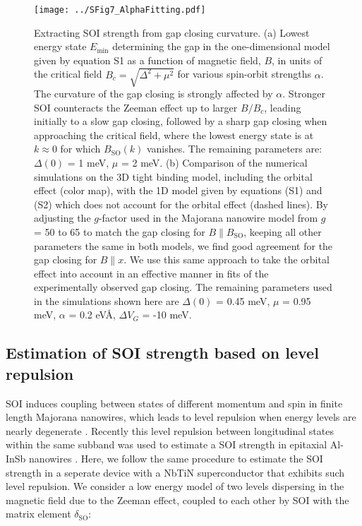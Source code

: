 \documentclass[prl,singlecolumn,notitlepage,secnumroman,superscriptaddress,nobibnotes,graphicx,amsmath,amssymb]{revtex4-2}
\begin{document}
\begin{figure}
\centering
\texttt{[image: ../SFig7\_AlphaFitting.pdf]}
\caption{\label{fig:SOIFit}
	Extracting SOI strength from gap closing curvature.
	(a) Lowest energy state $E_{\mathrm{min}}$ determining the gap in the one-dimensional model given by equation S1 as a function of magnetic field, $B$, in units of the critical field $B_c=\sqrt{\Delta^2+\mu^2}$ for various spin-orbit strengths $\alpha$. The curvature of the gap closing is strongly affected by $\alpha$. Stronger SOI counteracts the Zeeman effect up to larger $B/B_c$, leading initially to a slow gap closing, followed by a sharp gap closing when approaching the critical field, where the lowest energy state is at $k \approx 0$ for which $B_{\mathrm{SO}}(k)$ vanishes. The remaining parameters are: $\Delta(0)$ = 1 meV, $\mu$ = 2 meV. (b) Comparison of the numerical simulations on the 3D tight binding model, including the orbital effect (color map), with the 1D model given by equations (S1) and (S2) which does not account for the orbital effect (dashed lines). By adjusting the $g$-factor used in the Majorana nanowire model from $g$ = 50 to 65 to match the gap closing for $B \parallel B_{\mathrm{SO}}$, keeping all other parameters the same in both models, we find good agreement for the gap closing for $B \parallel x$. We use this same approach to take the orbital effect into account in an effective manner in fits of the experimentally observed gap closing. The remaining parameters used in the simulations shown here are $\Delta(0)$ = 0.45 meV, $\mu$ = 0.95 meV, $\alpha$ = 0.2 eV\AA, $\Delta V_G$ = -10 meV.
}
\end{figure}

\newpage
\subsection{Estimation of SOI strength based on level repulsion}
SOI induces coupling between states of different momentum and spin in finite length Majorana nanowires, which leads to level repulsion when energy levels are nearly degenerate \cite{Stanescu2013}. Recently this level repulsion between longitudinal states within the same subband was used to estimate a SOI strength in epitaxial Al-InSb nanowires \cite{DeMoor2018}. Here, we follow the same procedure to estimate the SOI strength in a seperate device with a NbTiN superconductor that exhibits such level repulsion. We consider a low energy model of two levels dispersing in the magnetic field due to the Zeeman effect, coupled to each other by SOI with the matrix element $\delta_{\mathrm{SO}}$:
\end{document}
